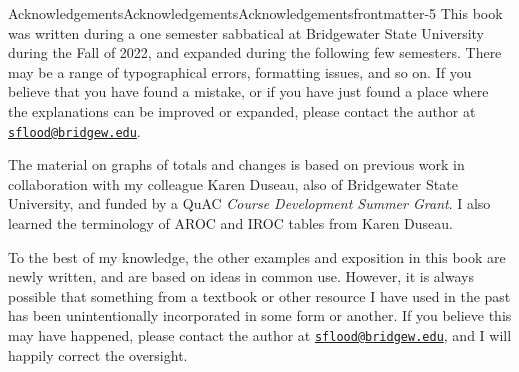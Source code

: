 \documentclass[oneside,10pt,]{tufte-book}
\numberwithin{equation}{chapter}
\begin{document}
\begin{acknowledgement}{Acknowledgements}{Acknowledgements}{}{Acknowledgements}{}{}{frontmatter-5}
This book was written during a one semester sabbatical at Bridgewater State University during the Fall of 2022, and expanded during the following few semesters. There may be a range of typographical errors, formatting issues, and so on. If you believe that you have found a mistake, or if you have just found a place where the explanations can be improved or expanded, please contact the author at \href{mailto:sflood@bridgew.edu}{\nolinkurl{sflood@bridgew.edu}}.%
\par
The material on graphs of totals and changes is based on previous work in collaboration with my colleague Karen Duseau, also of Bridgewater State University, and funded by a QuAC \emph{Course Development Summer Grant}. I also learned the terminology of AROC and IROC tables from Karen Duseau.%
\par
To the best of my knowledge, the other examples and exposition in this book are newly written, and are based on ideas in common use. However, it is always possible that something from a textbook or other resource I have used in the past has been unintentionally incorporated in some form or another. If you believe this may have happened, please contact the author at \href{mailto:sflood@bridgew.edu}{\nolinkurl{sflood@bridgew.edu}}, and I will happily correct the oversight.%
\end{acknowledgement}
\setcounter{tocdepth}{1}
\renewcommand*\contentsname{Contents}
\tableofcontents
\mainmatter
%
%
\typeout{************************************************}
\typeout{************************************************}
%
\end{document}

